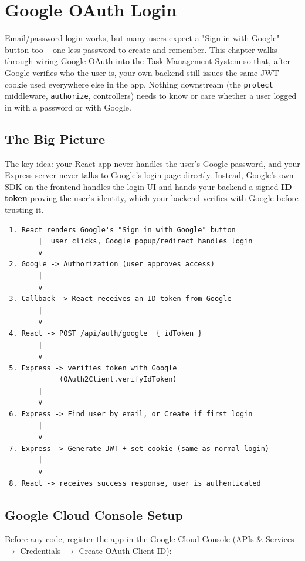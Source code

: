 \chapter{Google OAuth Login}

Email/password login works, but many users expect a "Sign in with Google"
button too -- one less password to create and remember. This chapter walks
through wiring Google OAuth into the Task Management System so that, after
Google verifies who the user is, your own backend still issues the same JWT
cookie used everywhere else in the app. Nothing downstream (the
\texttt{protect} middleware, \texttt{authorize}, controllers) needs to know
or care whether a user logged in with a password or with Google.

\section{The Big Picture}

The key idea: your React app never handles the user's Google password, and
your Express server never talks to Google's login page directly. Instead,
Google's own SDK on the frontend handles the login UI and hands your backend
a signed \textbf{ID token} proving the user's identity, which your backend
verifies with Google before trusting it.

\begin{diagrambox}
\begin{verbatim}
 1. React renders Google's "Sign in with Google" button
        |  user clicks, Google popup/redirect handles login
        v
 2. Google -> Authorization (user approves access)
        |
        v
 3. Callback -> React receives an ID token from Google
        |
        v
 4. React -> POST /api/auth/google  { idToken }
        |
        v
 5. Express -> verifies token with Google
             (OAuth2Client.verifyIdToken)
        |
        v
 6. Express -> Find user by email, or Create if first login
        |
        v
 7. Express -> Generate JWT + set cookie (same as normal login)
        |
        v
 8. React -> receives success response, user is authenticated
\end{verbatim}
\end{diagrambox}

\section{Google Cloud Console Setup}

Before any code, register the app in the Google Cloud Console (APIs \&
Services $\rightarrow$ Credentials $\rightarrow$ Create OAuth Client ID):


